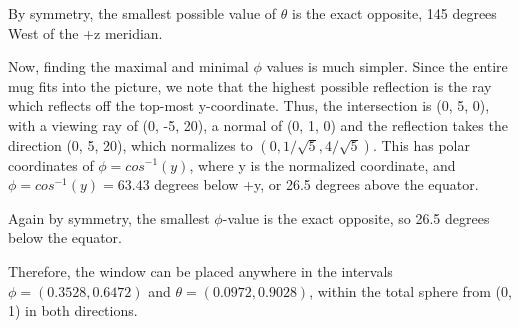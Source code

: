 \documentclass{letter}
\begin{document}
By symmetry, the smallest possible value of $\theta$ is the exact opposite, 145 degrees West of the +z meridian. 

Now, finding the maximal and minimal $\phi$ values is much simpler. Since the entire mug fits into the picture, we note that the highest possible reflection is the ray which reflects off the top-most y-coordinate. Thus, the intersection is (0, 5, 0), with a viewing ray of (0, -5, 20), a normal of (0, 1, 0) and the reflection takes the direction (0, 5, 20), which normalizes to $(0, 1/\sqrt{5}, 4/\sqrt{5})$. This has polar coordinates of $\phi = cos^{-1}(y)$, where y is the normalized coordinate, and $\phi = cos^{-1}(y) = 63.43$ degrees below +y, or 26.5 degrees above the equator. 

Again by symmetry, the smallest $\phi$-value is the exact opposite, so 26.5 degrees below the equator. 

Therefore, the window can be placed anywhere in the intervals $\phi = (0.3528, 0.6472)$ and $\theta = (0.0972, 0.9028)$, within the total sphere from (0, 1) in both directions.
\end{document}
